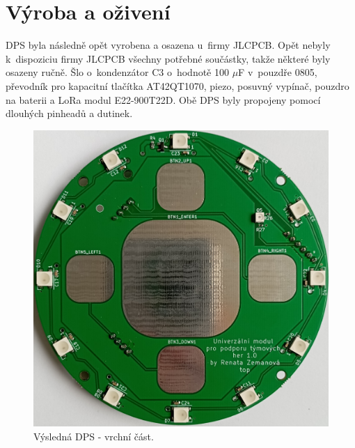 \newpage
\section{Výroba a oživení}

DPS byla následně opět vyrobena a osazena u~firmy JLCPCB. Opět nebyly k~dispoziciu firmy JLCPCB všechny potřebné součástky, takže některé byly osazeny ručně. Šlo o~kondenzátor C3 o~hodnotě 100 $\mu$F v~pouzdře 
0805, převodník pro kapacitní tlačítka AT42QT1070, piezo, posuvný vypínač, pouzdro na baterii a LoRa modul E22-900T22D. Obě DPS byly propojeny pomocí dlouhých pinheadů a dutinek. 

\begin{figure}[!h]
  \begin{center}
    \includegraphics[scale=0.15]{obrazky/DPS_final_vrchni.jpg}
  \end{center}
  \caption[Výsledná DPS - vrchní část]{Výsledná DPS - vrchní část.}
\end{figure}

